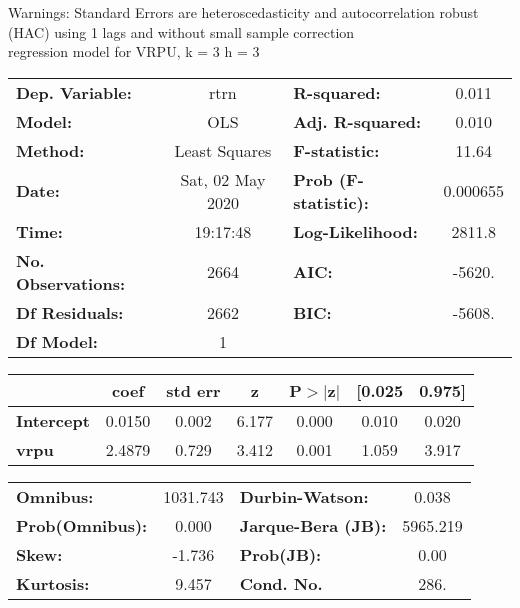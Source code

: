 Warnings: \newline
 [1] Standard Errors are heteroscedasticity and autocorrelation robust (HAC) using 1 lags and without small sample correction\\ 

regression model for VRPU, k = 3 h = 3\begin{center}
\begin{tabular}{lclc}
\toprule
\textbf{Dep. Variable:}    &       rtrn       & \textbf{  R-squared:         } &     0.011   \\
\textbf{Model:}            &       OLS        & \textbf{  Adj. R-squared:    } &     0.010   \\
\textbf{Method:}           &  Least Squares   & \textbf{  F-statistic:       } &     11.64   \\
\textbf{Date:}             & Sat, 02 May 2020 & \textbf{  Prob (F-statistic):} &  0.000655   \\
\textbf{Time:}             &     19:17:48     & \textbf{  Log-Likelihood:    } &    2811.8   \\
\textbf{No. Observations:} &        2664      & \textbf{  AIC:               } &    -5620.   \\
\textbf{Df Residuals:}     &        2662      & \textbf{  BIC:               } &    -5608.   \\
\textbf{Df Model:}         &           1      & \textbf{                     } &             \\
\bottomrule
\end{tabular}
\begin{tabular}{lcccccc}
                   & \textbf{coef} & \textbf{std err} & \textbf{z} & \textbf{P$> |$z$|$} & \textbf{[0.025} & \textbf{0.975]}  \\
\midrule
\textbf{Intercept} &       0.0150  &        0.002     &     6.177  &         0.000        &        0.010    &        0.020     \\
\textbf{vrpu}      &       2.4879  &        0.729     &     3.412  &         0.001        &        1.059    &        3.917     \\
\bottomrule
\end{tabular}
\begin{tabular}{lclc}
\textbf{Omnibus:}       & 1031.743 & \textbf{  Durbin-Watson:     } &    0.038  \\
\textbf{Prob(Omnibus):} &   0.000  & \textbf{  Jarque-Bera (JB):  } & 5965.219  \\
\textbf{Skew:}          &  -1.736  & \textbf{  Prob(JB):          } &     0.00  \\
\textbf{Kurtosis:}      &   9.457  & \textbf{  Cond. No.          } &     286.  \\
\bottomrule
\end{tabular}
\end{center}

